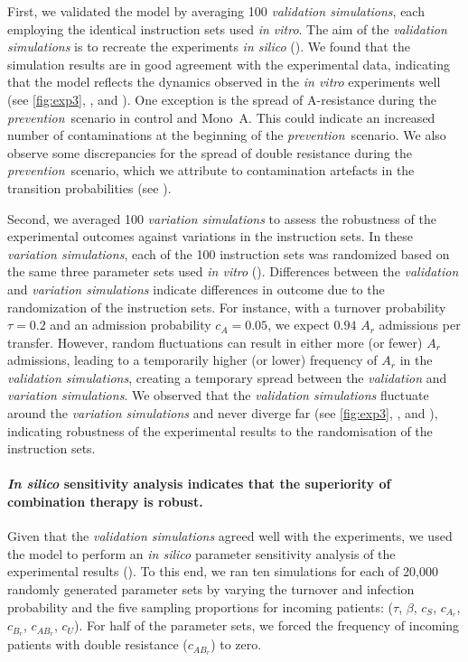 First, we validated the model by averaging 100 \textit{validation simulations}, each employing the identical instruction sets used \textit{in vitro}.
The aim of the \textit{validation simulations} is to recreate the experiments \textit{in silico} ().
We found that the simulation results are in good agreement with the experimental data, indicating that the model reflects the dynamics observed in the \textit{in vitro} experiments well (see \autoref{fig:exp3}, , and ).
One exception is the spread of A-resistance during the \textit{prevention}~scenario in control and Mono~A.
This could indicate an increased number of contaminations at the beginning of the \textit{prevention}~scenario.
We also observe some discrepancies for the spread of double resistance during the \textit{prevention}~scenario, which we attribute to contamination artefacts in the transition probabilities (see ).

Second, we averaged 100 \textit{variation simulations} to assess the robustness of the experimental outcomes against variations in the instruction sets.
In these \textit{variation simulations}, each of the 100 instruction sets was randomized based on the same three parameter sets used \textit{in vitro} ().
Differences between the \textit{validation} and \textit{variation simulations} indicate differences in outcome due to the randomization of the instruction sets.
For instance, with a turnover probability $\tau = 0.2$ and an admission probability $c_A = 0.05$, we expect $0.94$ $A_r$ admissions per transfer. However, random fluctuations can result in either more (or fewer) $A_r$ admissions, leading to a temporarily higher (or lower) frequency of $A_r$ in the \textit{validation simulations}, creating a temporary spread between the \textit{validation} and \textit{variation simulations}.
We observed that the \textit{validation simulations} fluctuate around the \textit{variation simulations} and never diverge far (see \autoref{fig:exp3}, , and ), indicating robustness of the experimental results to the randomisation of the instruction sets.

\paragraph{\textit{In silico} sensitivity analysis indicates that the superiority of combination therapy is robust.}
Given that the \textit{validation simulations} agreed well with the experiments, we used the model to perform an \textit{in silico} parameter sensitivity analysis of the experimental results ().
To this end, we ran ten simulations for each of 20,000 randomly generated parameter sets by varying the turnover and infection probability and the five sampling proportions for incoming patients: ($\tau$, $\beta$, $c_S$, $c_{A_r}$, $c_{B_r}$, $c_{AB_r}$, $c_U$).
For half of the parameter sets, we forced the frequency of incoming patients with double resistance ($c_{AB_r}$) to zero.

